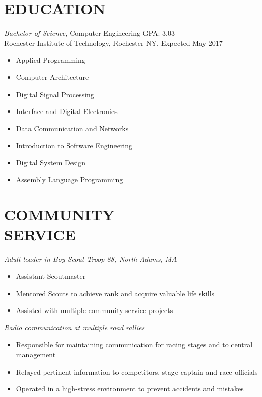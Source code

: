 \documentclass[line,margin]{res}
\begin{document}
\begin{resume}
\section{EDUCATION} {\sl Bachelor of Science,} Computer Engineering GPA: 3.03\\
                Rochester Institute of Technology, Rochester NY, 
				Expected May 2017 %
				\begin{multicols}{2}
					\begin{itemize}
						\itemsep -2pt
						\item[] Applied Programming
						\item[] Computer Architecture 
						\item[] Digital Signal Processing
						\item[] Interface and Digital Electronics
						\item[] Data Communication and Networks
						\item[] Introduction to Software Engineering
						\item[] Digital System Design
						\item[] Assembly Language Programming
					\end{itemize}
				\end{multicols}
 
\section{COMMUNITY \\ SERVICE}  
{\sl	Adult leader in Boy Scout Troop 88, North Adams, MA}
	\begin{itemize}  \itemsep -2pt %
		\item Assistant Scoutmaster
		\item Mentored Scouts to achieve rank and acquire valuable life skills%
		\item Assisted with multiple community service projects
	\end{itemize}
	\vspace{-5pt}
	{\sl	Radio communication at multiple road rallies}
	\begin{itemize}  \itemsep -2pt %
		\item Responsible for maintaining communication for racing stages and to central management
		\item Relayed pertinent information to competitors, stage captain and race officials
		\item Operated in a high-stress environment to prevent accidents and mistakes		
	\end{itemize}


\end{resume}
\end{document}
